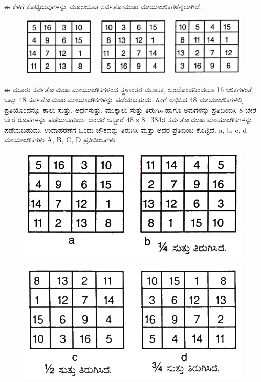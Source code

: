 ಈ ಕೆಳಗೆ ಕೊಟ್ಟಿರುವುಗಳನ್ನು ಮೂಲಭೂತ ಸರ್ವತೋಮುಖ ಮಾಯಾಚೌಕಗಳೆನ್ನಲಾಗಿದೆ.
\begin{figure}[h]
\includegraphics{src/figures/chap4/fig4.10.jpg}
\end{figure}

ಈ ಮೂರು ಸರ್ವತೋಮುಖ ಮಾಯಾಚೌಕಗಳಿಂದ ಸ್ಥಳಾಂತರ ಮೂಲಕ, ಒಂದೊಂದರಿಂದಲೂ 16 ಚೌಕಗಳಂತೆ, ಒಟ್ಟು 48 ಸರ್ವತೋಮುಖ ಮಾಯಾಚೌಕಗಳನ್ನು ಪಡೆಯಬಹುದು. ಹೀಗೆ ಲಭಿಸಿದ 48 ಮಾಯಾಚೌಕಗಳಲ್ಲಿ ಪ್ರತಿಯೊಂದನ್ನೂ ಕಾಲು ಸುತ್ತು, ಅರ್ಧಸುತ್ತು, ಮುಕ್ಕಾಲು ಸುತ್ತು ತಿರುಗಿಸಿ ಹಾಗೂ ಅವುಗಳನ್ನು ಪ್ರತಿಬಿಂಬಿಸಿ 8 ಬೇರೆ ಬೇರೆ ರೂಪಗಳನ್ನು ಪಡೆಯಬಹುದು. ಅಂದರೆ ಒಟ್ಟಾರೆ $48 \times 8$=384ರ ಸರ್ವತೋಮುಖ ಮಾಯಾಚೌಕಗಳನ್ನು ಪಡೆಯಬಹುದು. ಉದಾಹರಣೆಗೆ ಒಂದು ಚೌಕವನ್ನು ತಿರುಗಿಸಿ ಮತ್ತು ಅದರ ಪ್ರತಿಬಿಂಬ ಕೊಟ್ಟಿದೆ. a, b, c, d ಮಾಯಾಚೌಕಗಳು A, B, C, D ಪ್ರತಿಬಿಂಬಗಳು
\begin{figure}[h]
\includegraphics{src/figures/chap4/fig4.11.jpg}
\end{figure}
\begin{figure}[h]
\includegraphics{src/figures/chap4/fig4.12.jpg}
\end{figure}
